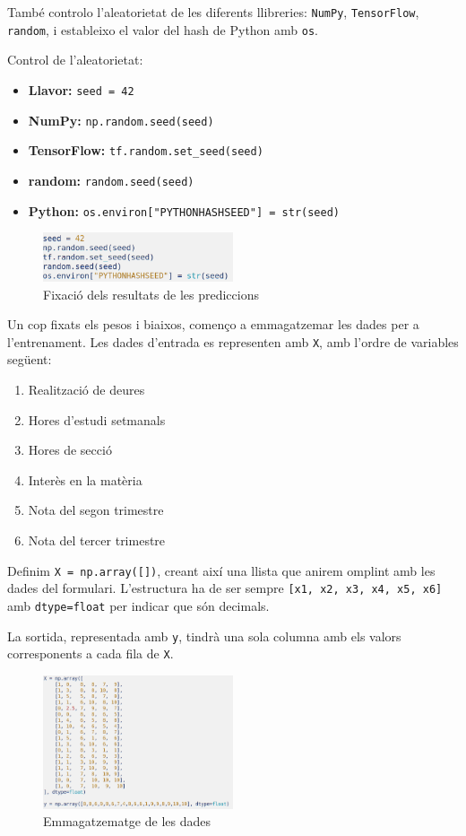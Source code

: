 També controlo l’aleatorietat de les diferents llibreries: \texttt{NumPy}, \texttt{TensorFlow}, \texttt{random}, i estableixo el valor del hash de Python amb \texttt{os}.

Control de l’aleatorietat:
\begin{itemize}
\item \textbf{Llavor:} \texttt{seed = 42}
\item \textbf{NumPy:} \texttt{np.random.seed(seed)}
\item \textbf{TensorFlow:} \texttt{tf.random.set\_seed(seed)}
\item \textbf{random:} \texttt{random.seed(seed)}
\item \textbf{Python:} \texttt{os.environ["PYTHONHASHSEED"] = str(seed)}
\end{itemize}

\begin{figure}[H]
\centering
\includegraphics[width=0.5\textwidth]{./figures/22.png}
\caption{Fixació dels resultats de les prediccions}
\end{figure}

Un cop fixats els pesos i biaixos, començo a emmagatzemar les dades per a l’entrenament. Les dades d’entrada es representen amb \texttt{X}, amb l’ordre de variables següent:

\begin{enumerate}
\item Realització de deures
\item Hores d’estudi setmanals
\item Hores de secció
\item Interès en la matèria
\item Nota del segon trimestre
\item Nota del tercer trimestre
\end{enumerate}

Definim \texttt{X = np.array([])}, creant així una llista que anirem omplint amb les dades del formulari. L’estructura ha de ser sempre \texttt{[x1, x2, x3, x4, x5, x6]} amb \texttt{dtype=float} per indicar que són decimals.

La sortida, representada amb \texttt{y}, tindrà una sola columna amb els valors corresponents a cada fila de \texttt{X}.

\begin{figure}[H]
\centering
\includegraphics[width=0.5\textwidth]{./figures/23.png}
\caption{Emmagatzematge de les dades}
\end{figure}

